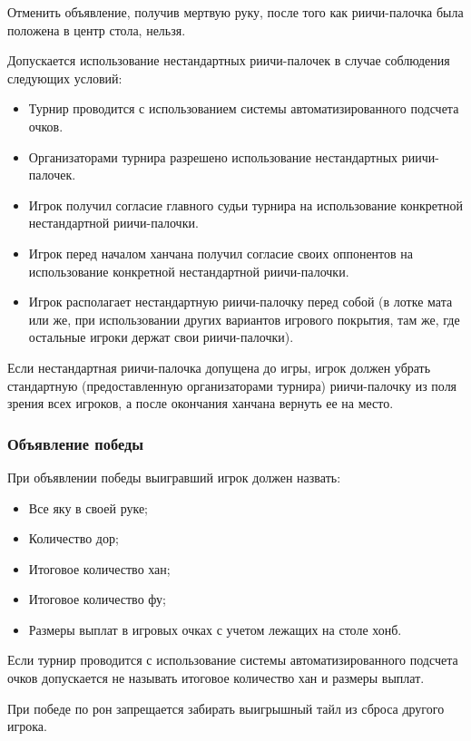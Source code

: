 Отменить объявление, получив мертвую руку, после того как риичи-палочка была положена в центр стола, нельзя.

Допускается использование нестандартных риичи-палочек в случае соблюдения следующих условий:

\begin{itemize}
	\item Турнир проводится с использованием системы автоматизированного подсчета очков.
	\item Организаторами турнира разрешено использование  нестандартных риичи-палочек.
	\item Игрок получил согласие главного судьи турнира на использование конкретной нестандартной риичи-палочки.
	\item Игрок перед началом ханчана получил согласие своих оппонентов на использование конкретной нестандартной риичи-палочки.
	\item Игрок располагает нестандартную риичи-палочку перед собой (в лотке мата или же, при использовании других вариантов игрового покрытия, там же, где остальные игроки держат свои риичи-палочки).
\end{itemize}

 Если нестандартная риичи-палочка допущена до игры, игрок должен убрать стандартную (предоставленную организаторами турнира) риичи-палочку из поля зрения всех игроков, а после окончания ханчана вернуть ее на место.

\subsubsection{Объявление победы}

При объявлении победы выигравший игрок должен назвать:

\begin{itemize}
	\item Все яку в своей руке;
	\item Количество дор;
	\item Итоговое количество хан;
	\item Итоговое количество фу;
	\item Размеры выплат в игровых очках с учетом лежащих на столе хонб.
\end{itemize}

Если турнир проводится с использование системы автоматизированного подсчета очков допускается не называть итоговое количество хан и размеры выплат.

При победе по рон запрещается забирать выигрышный тайл из сброса другого игрока. 


